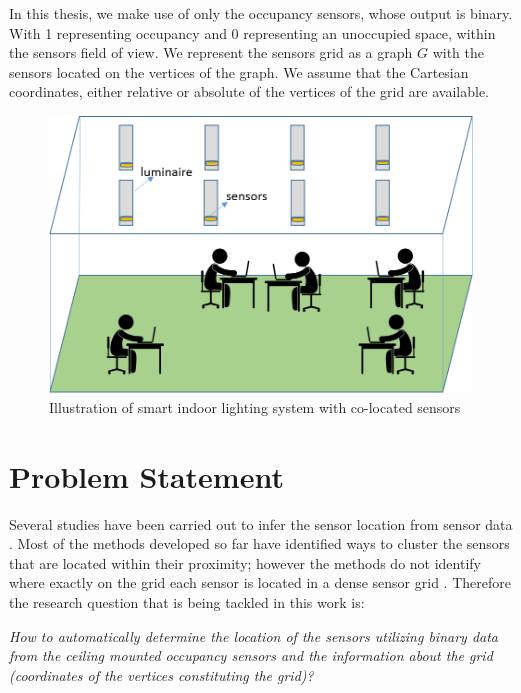 In this thesis, we make use of only the occupancy sensors, whose output is binary. With 1 representing occupancy and 0 representing an unoccupied space, within the sensors field of view. We represent the sensors grid as a graph $G$ with the sensors located on the vertices of the graph. We assume that the Cartesian coordinates, either relative or absolute of the vertices of the grid are available. 

\begin{figure}[!ht]
\includegraphics[scale=0.75]{./pics/systemDescription.png}
\caption{Illustration of smart indoor lighting system with co-located sensors}
\label{fig:sysDes}
\centering
\end{figure}

\section{Problem Statement}

Several studies  have been carried out to infer the sensor location from sensor data \cite{Hong:2013:TAS:2528282.2528302,doi:10.1061/9780784413616.226,Koc:2014:CLC:2674061.2674075,Lu:2014:SBS:2648771.2629441,ellis2012creating,muller2014automated,marinakis2005learning}. Most of the methods developed so far have identified ways to cluster the sensors that are located within their proximity; however the methods do not identify where exactly on the grid each sensor is located in a dense sensor grid \cite{Hong:2013:TAS:2528282.2528302,doi:10.1061/9780784413616.226,Koc:2014:CLC:2674061.2674075}.  Therefore the research question that is being tackled in this work is:

\textit{How to automatically determine the location of the sensors utilizing binary data from the ceiling mounted occupancy sensors and the information about the grid (coordinates of the vertices constituting the grid)?}\\



